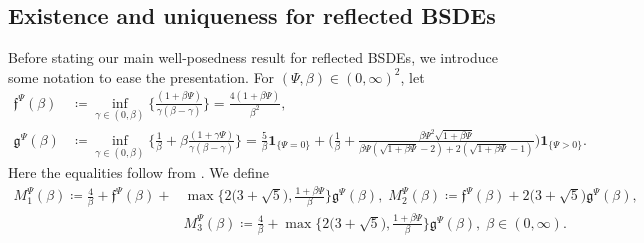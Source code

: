 \documentclass[10pt]{article} %
\newcommand\ff{\mathfrak f}
\newcommand\fg{\mathfrak g}
\begin{document}
\subsection{Existence and uniqueness for reflected BSDEs}\label{sec::main_results_rbsde}

Before stating our main well-posedness result for reflected BSDEs, we introduce some notation to ease the presentation. For $(\Psi,\beta) \in (0,\infty)^2$, let
\begin{align*}
	\ff^\Psi(\beta) &\coloneqq \inf_{\gamma\in (0,\beta)} \bigg\{\frac{(1+\beta\Psi)}{\gamma(\beta-\gamma)}\bigg\} = \frac{4(1+\beta\Psi)}{\beta^2},\\
	\fg^\Psi(\beta) &\coloneqq \inf_{\gamma \in (0,\beta)} \bigg\{\frac{1}{\beta} + \beta \frac{(1+\gamma\Psi)}{\gamma(\beta-\gamma)}\bigg\} = \frac{5}{\beta} \mathbf{1}_{\{\Psi = 0\}} + \bigg(  \frac{1}{\beta} + \frac{\beta\Psi^2\sqrt{1+\beta\Psi}}{\beta\Psi(\sqrt{1+\beta\Psi}-2)+2(\sqrt{1+\beta\Psi}-1)}\bigg)\mathbf{1}_{\{\Psi > 0\}}.
\end{align*}
Here the equalities follow from . We define
\begin{align*}
	M_1^\Psi(\beta) \coloneqq \frac{4}{\beta} + \ff^\Psi(\beta) + &\max\bigg\{2\big(3+\sqrt{5}\big),\frac{1+\beta\Psi}\beta\bigg\}\fg^\Psi(\beta),\; M_2^\Psi (\beta)\coloneqq \ff^\Psi(\beta) + 2\big(3+\sqrt{5}\big)\fg^\Psi(\beta),\\
	&M_3^\Psi (\beta)\coloneqq \frac{4}{\beta} + \max\bigg\{2\big(3+\sqrt{5}\big),\frac{1+\beta\Psi}\beta\bigg\}\fg^\Psi(\beta),\; \beta \in (0,\infty).
\end{align*}
\end{document}
